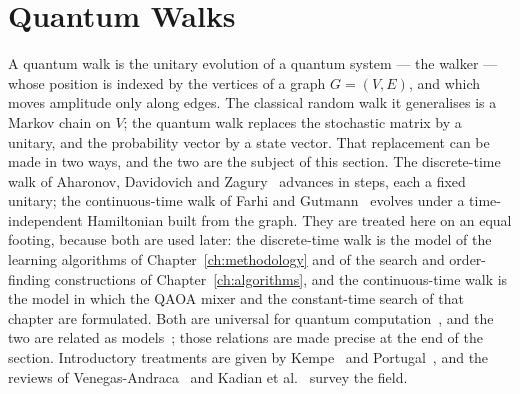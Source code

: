 \section{Quantum Walks}
\label{sec:prelim-qw}

A quantum walk is the unitary evolution of a quantum system --- the walker
--- whose position is indexed by the vertices of a graph $G = (V, E)$, and
which moves amplitude only along edges. The classical random walk it
generalises is a Markov chain on $V$; the quantum walk replaces the
stochastic matrix by a unitary, and the probability vector by a state
vector. That replacement can be made in two ways, and the two are the
subject of this section. The discrete-time walk of Aharonov, Davidovich and
Zagury~\cite{Aharonov_1993} advances in steps, each a fixed unitary; the
continuous-time walk of Farhi and Gutmann~\cite{Farhi_1997} evolves under a
time-independent Hamiltonian built from the graph. They are treated here on
an equal footing, because both are used later: the discrete-time walk is the
model of the learning algorithms of Chapter~\ref{ch:methodology} and of the
search and order-finding constructions of Chapter~\ref{ch:algorithms}, and
the continuous-time walk is the model in which the QAOA mixer and the
constant-time search of that chapter are formulated. Both are universal for
quantum computation~\cite{PhysRevLett.102.180501, ett2010universal}, and the
two are related as models~\cite{Childs2010, strauch2006connecting}; those
relations are made precise at the end of the section. Introductory
treatments are given by Kempe~\cite{Kempe_2003} and
Portugal~\cite{Portugal_2018}, and the reviews of
Venegas-Andraca~\cite{Elias_2012} and Kadian et al.~\cite{Kadian_2021} survey
the field.


